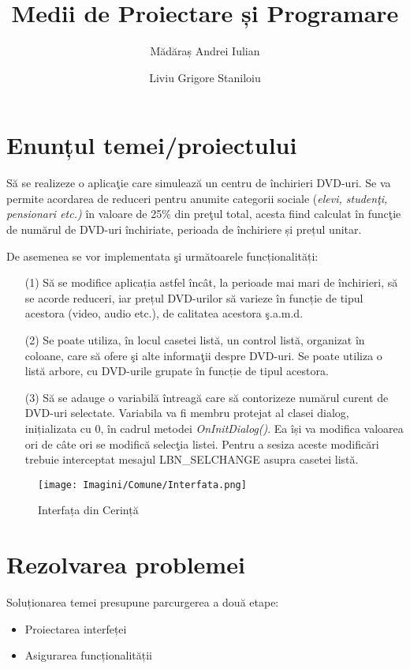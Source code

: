 \documentclass{amsart}
\title{Medii de Proiectare și Programare}
\author{Mădăraș Andrei Iulian}
\author{Liviu Grigore Staniloiu }
\begin{document}
\maketitle

\section{Enunțul temei/proiectului}
Să se realizeze o aplicaţie care simulează un centru de
închirieri DVD-uri. Se va permite acordarea de reduceri pentru anumite
categorii sociale (\textit{elevi, studenţi, pensionari etc.)} în valoare de 25\% din
preţul total, acesta fiind calculat în funcţie de numărul de DVD-uri
închiriate, perioada de închiriere și prețul unitar.

\hfill \newline

De asemenea se vor implementata \c{s}i următoarele funcționalități:
\begin{itemize}
\item[(1)] Să se modifice aplicația astfel încât, la perioade mai mari de închirieri, să se acorde
reduceri, iar prețul DVD-urilor să varieze în funcție de tipul acestora (video, audio
etc.), de calitatea acestora ş.a.m.d.
\hfill \newline
\item[(2)] Se poate utiliza, în locul casetei listă, un control listă, organizat în coloane, care să
ofere şi alte informaţii despre DVD-uri. Se poate utiliza o listă arbore, cu DVD-urile
grupate în funcție de tipul acestora.
\hfill \newline
\item[(3)] Să se adauge o variabilă întreagă care să contorizeze numărul curent de DVD-uri
selectate. Variabila va fi membru protejat al clasei dialog, inițializata cu 0, în cadrul
metodei \textit{OnInitDialog()}. Ea își va modifica valoarea ori de câte ori se modifică
selecţia listei. Pentru a sesiza aceste modificări trebuie interceptat mesajul
LBN\_SELCHANGE asupra casetei listă.
\end{itemize}

\begin{figure}[h]
    \centering
    \texttt{[image: Imagini/Comune/Interfata.png]}
    \caption{Interfața din Cerință}
    \label{fig:mesh1}
\end{figure}



\newpage

\section{Rezolvarea problemei}
\quad Soluționarea temei presupune parcurgerea a două etape:
\begin{itemize}
    
    \item Proiectarea interfeței 
    \item Asigurarea funcționalității
\end{itemize}
\end{document}
